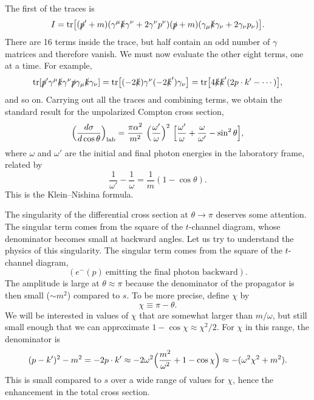 The first of the traces is
\begin{equation}
  I = \mathrm{tr}\bigl[ (\slashed{p}'+m)(\gamma^\mu\slashed{k}\gamma^\nu
    + 2\gamma^\nu p^\nu)(\slashed{p}+m)(\gamma_\mu\slashed{k}\gamma_\nu
      + 2\gamma_\nu p_\nu) \bigr] .
  \label{eq:5.84}
\end{equation}
There are 16 terms inside the trace, but half contain an odd number of
$\gamma$ matrices and therefore vanish.  We must now evaluate the other eight
terms, one at a time.  For example,
\begin{equation}
  \mathrm{tr}[\slashed{p}'\gamma^\mu\slashed{k}\gamma^\nu\slashed{p}
    \gamma_\mu\slashed{k}\gamma_\nu]
  = \mathrm{tr}\bigl[ (-2\slashed{k})\gamma^\nu(-2\slashed{k}')\gamma_\nu
    \bigr]
  = \mathrm{tr}\bigl[ 4\slashed{k}\slashed{k}'(2p\cdot k'-\cdots) \bigr],
\end{equation}
and so on.  Carrying out all the traces and combining terms, we obtain the
standard result for the unpolarized Compton cross section,
\begin{equation}
  \Bigl( \frac{d\sigma}{d\cos\theta} \Bigr)_{\mathrm{lab}}
    = \frac{\pi\alpha^2}{m^2}\ \Bigl(
      \frac{\omega'}{\omega} \Bigr)^2\ \Bigl[
        \frac{\omega'}{\omega} + \frac{\omega}{\omega'}
        - \sin^2\theta \Bigr] ,
  \label{eq:5.94}
\end{equation}
where $\omega$ and $\omega'$ are the initial and final photon energies in the
laboratory frame, related by
\begin{equation}
  \frac{1}{\omega'} - \frac{1}{\omega} = \frac{1}{m}(1-\cos\theta) .
  \label{eq:5.95}
\end{equation}
This is the Klein--Nishina formula.

The singularity of the differential cross section at $\theta\to\pi$ deserves
some attention.  The singular term comes from the square of the
$t$-channel diagram, whose denominator becomes small at backward angles.  Let
us try to understand the physics of this singularity.  The singular term
comes from the square of the $t$-channel diagram,
\begin{equation}
  (e^{-}(p)\ \text{emitting the final photon backward}).
\end{equation}
The amplitude is large at $\theta\approx\pi$ because the denominator of the
propagator is then small ($\sim m^2$) compared to $s$.  To be more precise,
define $\chi$ by
\begin{equation}
  \chi \equiv \pi - \theta .
\end{equation}
We will be interested in values of $\chi$ that are somewhat larger than
$m/\omega$, but still small enough that we can approximate
$1-\cos\chi \approx \chi^2/2$.  For $\chi$ in this range, the denominator is
\begin{equation}
  (p-k')^2 - m^2 = -2p\cdot k' \approx -2\omega^2\Bigl( \frac{m^2}{\omega^2}
    + 1 - \cos\chi \Bigr) \approx -(\omega^2\chi^2 + m^2) .
  \label{eq:5.98}
\end{equation}
This is small compared to $s$ over a wide range of values for $\chi$, hence
the enhancement in the total cross section.

